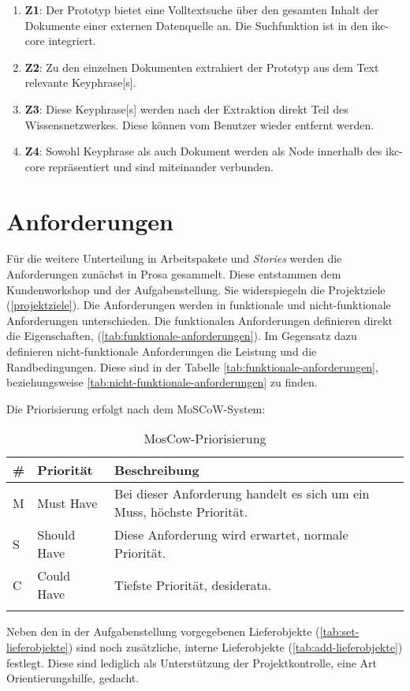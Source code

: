 \begin{enumerate}
    \item \textbf{Z1}: Der Prototyp bietet eine Volltextsuche über den gesamten Inhalt der Dokumente einer externen Datenquelle an. Die Suchfunktion ist in den \gls{ikc-core} integriert.
    \item \textbf{Z2}: Zu den einzelnen Dokumenten extrahiert der Prototyp aus dem Text relevante \gls{Keyphrase}[s].
    \item \textbf{Z3}: Diese \gls{Keyphrase}[s] werden nach der Extraktion direkt Teil des Wissensnetzwerkes. Diese können vom Benutzer wieder entfernt werden.
    \item \textbf{Z4}: Sowohl \gls{Keyphrase} als auch Dokument werden als Node innerhalb des \gls{ikc-core} repräsentiert und sind miteinander verbunden. 
\end{enumerate}

\section{Anforderungen} \label{sec:anforderungen}

Für die weitere Unterteilung in Arbeitspakete und \textit{Stories} werden die Anforderungen zunächst in Prosa gesammelt. Diese entstammen dem Kundenworkshop und der Aufgabenstellung. Sie widerspiegeln die Projektziele (\autoref{projektziele}). Die Anforderungen werden in funktionale und nicht-funktionale Anforderungen unterschieden. Die funktionalen Anforderungen definieren direkt die Eigenschaften, (\autoref{tab:funktionale-anforderungen}). Im Gegensatz dazu definieren nicht-funktionale Anforderungen die Leistung und die Randbedingungen. Diese sind in der Tabelle \autoref{tab:funktionale-anforderungen}, beziehungsweise \autoref{tab:nicht-funktionale-anforderungen} zu finden.

Die Priorisierung erfolgt nach dem \gls{MoSCoW-System}:

\begin{longtable}{|p{1.5cm} | p{2.5cm} | p{7.2cm}|}
  \hline
    \# & Priorität & Beschreibung \\\hline
    M & Must Have & Bei dieser Anforderung handelt es sich um ein Muss, höchste Priorität.\\\hline
    S & Should Have & Diese Anforderung wird erwartet, normale Priorität.\\\hline
    C & Could Have & Tiefste Priorität, desiderata.\\\hline
    \caption{MosCow-Priorisierung}
  \label{tab:moscow}
\end{longtable}


Neben den in der Aufgabenstellung vorgegebenen Lieferobjekte (\autoref{tab:set-lieferobjekte}) sind noch zusätzliche, interne Lieferobjekte (\autoref{tab:add-lieferobjekte}) festlegt. Diese sind lediglich als Unterstützung der Projektkontrolle, eine Art Orientierungshilfe, gedacht.

